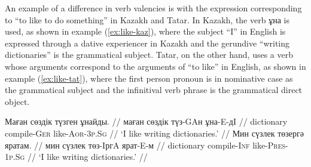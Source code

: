 \documentclass[a4paper,11pt]{article}
\newcommand{\gmk}[1]{{\qipb\scshape #1}}
\newcommand{\eng}[1]{`#1'}
\begin{document}



An example of a difference in verb valencies is with the expression corresponding 
to ``to like to do something'' in Kazakh and Tatar.  In Kazakh, the verb ұна is used, as shown in 
example (\ref{ex:like-kaz}), where the subject ``I'' in English is expressed through a dative 
experiencer in Kazakh and the gerundive ``writing dictionaries'' is the grammatical subject.  Tatar, on the 
other hand, uses a verb whose arguments correspond to the arguments of ``to like'' in English, as 
shown in example (\ref{ex:like-tat}), where the first person pronoun is in nominative case as 
the grammatical subject and the infinitival verb phrase is the grammatical direct object.


\pex[everygla=,everyglb=,everyglc=\small,aboveglbskip=0pt,aboveglftskip=0ex]  %
\vspace{-1.5ex}
\label{ex:like-kaz}
\begingl
\gla Маған сөздік түзген ұнайды. //
\glb маған сөздік түз-GAн ұна-E-дI //
\glc \gmk{1p.Sg.Dat} dictionary compile-\gmk{Ger} like-\gmk{Aor}-\gmk{3p.Sg} //
\glft \eng{I like writing dictionaries.} //
\endgl
\xe
\pex[everygla=,everyglb=,everyglc=,aboveglbskip=0pt,aboveglftskip=0ex]  %
\vspace{-1.5ex}
\label{ex:like-tat}
\begingl
\gla Мин сүзлек төзергә яратам. //
\glb мин сүзлек төз-IргA ярат-E-м //
\glc \gmk{1p.Sg} dictionary compile-\gmk{Inf} like-\gmk{Pres}-\gmk{1p.Sg} //
\glft \eng{I like writing dictionaries.} //
\endgl
\xe
\end{document}

